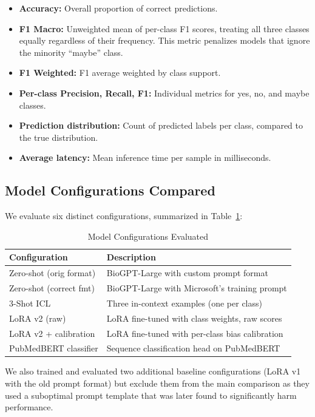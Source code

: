 \documentclass[conference]{IEEEtran}
\begin{document}
\begin{itemize}[leftmargin=*]
    \item \textbf{Accuracy:} Overall proportion of correct predictions.
    \item \textbf{F1 Macro:} Unweighted mean of per-class F1 scores, treating all three classes equally regardless of their frequency. This metric penalizes models that ignore the minority ``maybe'' class.
    \item \textbf{F1 Weighted:} F1 average weighted by class support.
    \item \textbf{Per-class Precision, Recall, F1:} Individual metrics for yes, no, and maybe classes.
    \item \textbf{Prediction distribution:} Count of predicted labels per class, compared to the true distribution.
    \item \textbf{Average latency:} Mean inference time per sample in milliseconds.
\end{itemize}

\subsection{Model Configurations Compared}

We evaluate six distinct configurations, summarized in Table~\ref{tab:configurations}:

\begin{table}[h]
\centering
\caption{Model Configurations Evaluated}
\label{tab:configurations}
\begin{tabular}{p{3.5cm}p{4cm}}
\toprule
\textbf{Configuration} & \textbf{Description} \\
\midrule
Zero-shot (orig format) & BioGPT-Large with custom prompt format \\
Zero-shot (correct fmt) & BioGPT-Large with Microsoft's training prompt \\
3-Shot ICL & Three in-context examples (one per class) \\
LoRA v2 (raw) & LoRA fine-tuned with class weights, raw scores \\
LoRA v2 + calibration & LoRA fine-tuned with per-class bias calibration \\
PubMedBERT classifier & Sequence classification head on PubMedBERT \\
\bottomrule
\end{tabular}
\end{table}

We also trained and evaluated two additional baseline configurations (LoRA v1 with the old prompt format) but exclude them from the main comparison as they used a suboptimal prompt template that was later found to significantly harm performance.
\end{document}
